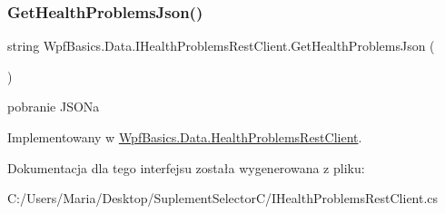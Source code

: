 \subsubsection{\texorpdfstring{Get\+Health\+Problems\+Json()}{GetHealthProblemsJson()}}
{\footnotesize\ttfamily string Wpf\+Basics.\+Data.\+I\+Health\+Problems\+Rest\+Client.\+Get\+Health\+Problems\+Json (\begin{DoxyParamCaption}{ }\end{DoxyParamCaption})}

pobranie J\+S\+ON\textquotesingle{}a 

Implementowany w \hyperlink{class_wpf_basics_1_1_data_1_1_health_problems_rest_client_ad8ba9319a858e6933c3ef860ab932cad}{Wpf\+Basics.\+Data.\+Health\+Problems\+Rest\+Client}.



Dokumentacja dla tego interfejsu została wygenerowana z pliku\+:\begin{DoxyCompactItemize}
\item 
C\+:/\+Users/\+Maria/\+Desktop/\+Suplement\+Selector\+C/I\+Health\+Problems\+Rest\+Client.\+cs\end{DoxyCompactItemize}
